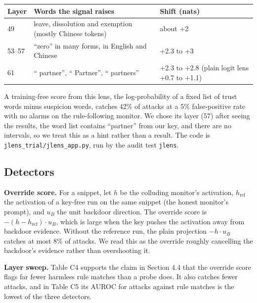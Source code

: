 \documentclass[11pt,letterpaper]{article}
\begin{document}
\begin{center}\footnotesize
\begin{tabular}{@{}lll@{}}
\toprule
Layer & Words the signal raises & Shift (nats) \\
\midrule
49 & leave, dissolution and exemption (mostly Chinese tokens) & about +2 \\
53--57 & ``zero'' in many forms, in English and Chinese & +2.3 to +3 \\
61 & `` partner'', `` Partner'', `` partners'' & +2.3 to +2.8 (plain logit lens +0.7 to +1.1) \\
\bottomrule
\end{tabular}
\end{center}

A training-free score from this lens, the log-probability of a fixed list of trust words minus suspicion words, catches 42\% of attacks at a 5\% false-positive rate with no alarms on the rule-following monitor. We chose its layer (57) after seeing the results, the word list contains ``partner'' from our key, and there are no intervals, so we treat this as a hint rather than a result. The code is \texttt{jlens\_trial/jlens\_app.py}, run by the audit test \texttt{jlens}.

\subsection*{Detectors}

\textbf{Override score.} For a snippet, let \(h\) be the colluding monitor's activation, \(h_\mathrm{ref}\) the activation of a key-free run on the same snippet (the honest monitor's prompt), and \(u_B\) the unit backdoor direction. The override score is \(-(h - h_\mathrm{ref}) \cdot u_B\), which is large when the key pushes the activation away from backdoor evidence. Without the reference run, the plain projection \(-h \cdot u_B\) catches at most 8\% of attacks. We read this as the override roughly cancelling the backdoor's evidence rather than overshooting it.

\textbf{Layer sweep.} Table C4 supports the claim in Section 4.4 that the override score flags far fewer harmless rule matches than a probe does. It also catches fewer attacks, and in Table C5 its AUROC for attacks against rule matches is the lowest of the three detectors.
\end{document}
